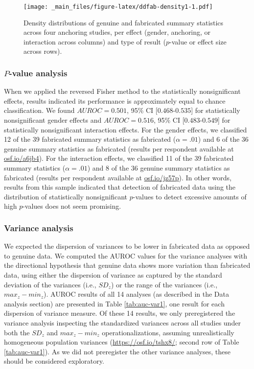 \documentclass[a5paper]{book}
\begin{document}
\begin{figure}
\centering
\texttt{[image: \_main\_files/figure-latex/ddfab-density1-1.pdf]}
\caption{\label{fig:ddfab-density1}Density distributions of genuine and
fabricated summary statistics across four anchoring studies, per effect
(gender, anchoring, or interaction across columns) and type of result
(\(p\)-value or effect size across rows).}
\end{figure}

\subsubsection{\texorpdfstring{\(P\)-value
analysis}{P-value analysis}}\label{p-value-analysis-1}

When we applied the reversed Fisher method to the statistically
nonsignificant effects, results indicated its performance is
approximately equal to chance classification. We found \(AUROC=0.501\),
95\% CI {[}\(0.468\)-\(0.535\){]} for statistically nonsignificant
gender effects and \(AUROC=0.516\), 95\% CI {[}\(0.483\)-\(0.549\){]}
for statistically nonsignificant interaction effects. For the gender
effects, we classified 12 of the 39 fabricated summary statistics as
fabricated (\(\alpha=.01\)) and 6 of the 36 genuine summary statistics
as fabricated (results per respondent available at
\href{https://osf.io/a6jb4}{osf.io/a6jb4}). For the interaction effects,
we classified 11 of the 39 fabricated summary statistics
(\(\alpha=.01\)) and 8 of the 36 genuine summary statistics as
fabricated (results per respondent available at
\href{https://osf.io/jz57p}{osf.io/jz57p}). In other words, results from
this sample indicated that detection of fabricated data using the
distribution of statistically nonsignificant \(p\)-values to detect
excessive amounts of high \(p\)-values does not seem promising.

\subsubsection{Variance analysis}\label{variance-analysis-1}

We expected the dispersion of variances to be lower in fabricated data
as opposed to genuine data. We computed the AUROC values for the
variance analyses with the directional hypothesis that genuine data
shows more variation than fabricated data, using either the dispersion
of variance as captured by the standard deviation of the variances
(i.e., \(SD_z\)) or the range of the variances (i.e., \(max_z-min_z\)).
AUROC results of all 14 analyses (as described in the Data analysis
section) are presented in Table \ref{tab:auc-var1}, one result for each
dispersion of variance measure. Of these 14 results, we only
preregistered the variance analysis inspecting the standardized
variances across all studies under both the \(SD_z\) and \(max_z-min_z\)
operationalizations, assuming unrealistically homogeneous population
variances (\url{https://osf.io/tshx8/}; second row of Table
\ref{tab:auc-var1}). As we did not preregister the other variance
analyses, these should be considered exploratory.
\end{document}
